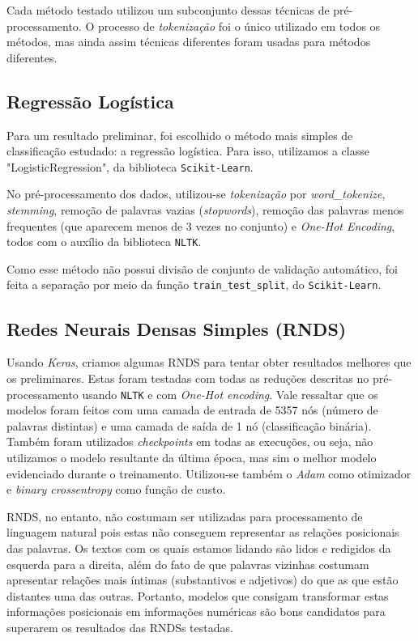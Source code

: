 \documentclass[twoside,conference,a4paper]{IEEEtran}
\begin{document}
    Cada método testado utilizou um subconjunto dessas técnicas de pré-processamento. O processo de \textit{tokenização} foi o único utilizado em todos os métodos, mas ainda assim técnicas diferentes foram usadas para métodos diferentes.

\subsection{Regressão Logística}

    Para um resultado preliminar, foi escolhido o método mais simples de classificação estudado: a regressão logística. Para isso, utilizamos  a classe "LogisticRegression", da biblioteca \texttt{Scikit-Learn}.
    
    No pré-processamento dos dados, utilizou-se \textit{tokenização} por \textit{word\_tokenize}, \textit{stemming}, remoção de palavras vazias (\textit{stopwords}), remoção das palavras menos frequentes (que aparecem menos de 3 vezes no conjunto) e \textit{One-Hot Encoding}, todos com o auxílio da biblioteca \texttt{NLTK}.
    
    Como esse método não possui divisão de conjunto de validação automático, foi feita a separação por meio da função \texttt{train\_test\_split}, do \texttt{Scikit-Learn}.

\subsection{Redes Neurais Densas Simples (RNDS)}

    Usando \textit{Keras}, criamos algumas RNDS para tentar obter resultados melhores que os preliminares. Estas foram testadas com todas as reduções descritas no pré-processamento usando \texttt{NLTK} e com \textit{One-Hot encoding}. Vale ressaltar que os modelos foram feitos com uma camada de entrada de 5357 nós (número de palavras distintas) e uma camada de saída de 1 nó (classificação binária). Também foram utilizados \textit{checkpoints} em todas as execuções, ou seja, não utilizamos o modelo resultante da última época, mas sim o melhor modelo evidenciado durante o treinamento. Utilizou-se também o \textit{Adam} como otimizador e \textit{binary crossentropy} como função de custo.
    
    RNDS, no entanto, não costumam ser utilizadas para processamento de linguagem natural pois estas não conseguem representar as relações posicionais das palavras. Os textos com os quais estamos lidando são lidos e redigidos da esquerda para a direita, além do fato de que palavras vizinhas costumam apresentar relações mais íntimas (substantivos e adjetivos) do que as que estão distantes uma das outras. Portanto, modelos que consigam transformar estas informações posicionais em informações numéricas são bons candidatos para superarem os resultados das RNDSs testadas.
\end{document}
